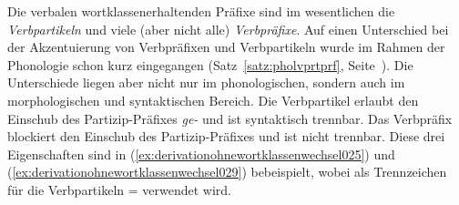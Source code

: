 
Die verbalen wortklassenerhaltenden Präfixe sind im wesentlichen die \textit{Verbpartikeln} und viele (aber nicht alle) \textit{Verbpräfixe}.
Auf einen Unterschied bei der Akzentuierung von Verbpräfixen und Verbpartikeln wurde im Rahmen der Phonologie schon kurz eingegangen (Satz~\ref{satz:pholvprtprf}, Seite~\pageref{satz:pholvprtprf}).
Die Unterschiede liegen aber nicht nur im phonologischen, sondern auch im morphologischen und syntaktischen Bereich.
Die Verbpartikel erlaubt den Einschub des Partizip-Präfixes \textit{ge-} und ist syntaktisch trennbar.
Das Verbpräfix blockiert den Einschub des Partizip-Präfixes und ist nicht trennbar.
Diese drei Eigenschaften sind in (\ref{ex:derivationohnewortklassenwechsel025}) und (\ref{ex:derivationohnewortklassenwechsel029}) bebeispielt, wobei als Trennzeichen für die Verbpartikeln = verwendet wird.

\begin{exe}
\end{exe}

